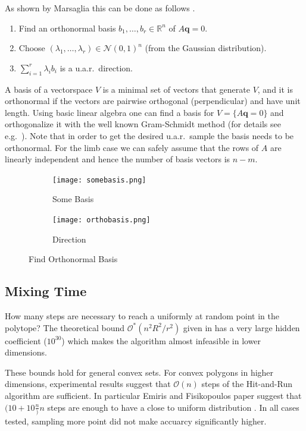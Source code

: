 As shown by Marsaglia this can be done as follows \cite{Marsaglia}.

\begin{enumerate}
\item
Find an orthonormal basis $b_1, \dots, b_r \in \mathbb{R}^{n}$ of $A\textbf{q} =0$.
\item
Choose $(\lambda_1, \dots, \lambda_r) \in \mathcal{N}(0,1)^n$ (from the Gaussian distribution).
\item
$\sum_{i=1}^r \lambda_i b_i$ is a u.a.r.\ direction.
\end{enumerate}

A basis of a vectorspace $V$ is a minimal set of vectors that generate $V$, and it is orthonormal if the vectors are pairwise orthogonal (perpendicular) and have unit length. Using basic linear algebra one can find a basis for $V = \{A\textbf{q} = 0\}$ and orthogonalize it with the well known Gram-Schmidt method (for details see e.g.\ \cite{Robertson}). Note that in order to get the desired u.a.r.\ sample the basis needs to be orthonormal. For the limb case we can safely assume that the rows of $A$ are linearly independent and hence the number of basis vectors is $n-m$.



\begin{figure}
        \centering
        \begin{subfigure}[b]{0.25\textwidth}
                \texttt{[image: somebasis.png]}
      \caption{Some Basis}
      \label{fig_somebasis}
              \end{subfigure} \hspace{0.5cm}
        \begin{subfigure}[b]{0.25\textwidth}
                \texttt{[image: orthobasis.png]}
     \caption{Direction}
      \label{Orthonormal Basis}        
      \end{subfigure}
      \caption{Find Orthonormal Basis}\label{fig_basis} 
\end{figure}


\subsection{Mixing Time}
How many steps are necessary to reach a uniformly at random point in the polytope? The theoretical bound $\mathcal{O}^*(n^2R^2/r^2)$ given in \cite{Lovasz} has a very large hidden coefficient ($10^30$) which makes the algorithm almost infeasible in lower dimensions.

These bounds hold for general convex sets. For convex polygons in higher dimensions, experimental results suggest that $\mathcal{O}(n)$ steps of the Hit-and-Run algorithm are sufficient. In particular Emiris and Fisikopoulos paper suggest that $(10 + 10\frac{n})n$ steps are enough to have a close to uniform distribution \cite{Emiris}. In all cases tested, sampling more point did not make accuarcy significantly higher. 

